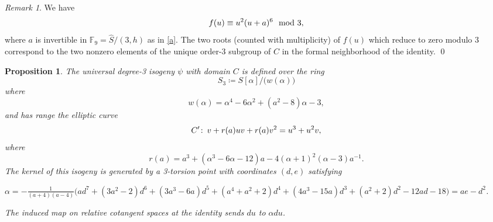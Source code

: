 \documentclass{gtpart}
\newtheorem{prop}[thm]{Proposition}
\theoremstyle{definition}
\theoremstyle{remark}
\newtheorem{rmk}[thm]{Remark}
\def\co{\colon\thinspace}
\newcommand{\mb}[1]{\mathbb{#1}}
\newcommand{\BF}{{\mb F}}
\newcommand{\HS}{\widehat{S}}
\newcommand{\md}{~~{\rm mod}~}
\newcommand{\A}{\alpha}
\begin{document}
\begin{rmk}
\label{rmk:dmod3}
 We have 
 \[
  f(u) \equiv u^2 (u + a)^6 \md 3, 
 \]
 where $a$ is invertible in $\BF_9 = \HS / (3,h)$ as in \eqref{a}.  
 The two roots (counted with multiplicity) of $f(u)$ which reduce to zero modulo 3 correspond to 
 the two nonzero elements of the unique order-3 subgroup of $C$ in the formal neighborhood of the identity.  
\qed
\end{rmk}

\begin{prop}
\label{prop:isog}
 The universal degree-3 isogeny $\psi$ with domain $C$ is defined over the ring 
 \[
  S_3 \coloneqq S[\A] \big/ \big( w(\A) \big) 
 \]
 where 
 \[
  w(\A) = \A^4 - 6 \A^2 + (a^2 - 8) \A - 3, 
 \]
 and has range the elliptic curve 
 \[
  C' \co v + r(a) u v + r(a) v^2 = u^3 + u^2 v, 
 \]
 where 
 \[
  r(a) = a^3 + (\A^3 - 6 \A - 12) a - 4 (\A + 1)^2 (\A - 3) a^{-1}.  
 \]
 The kernel of this isogeny is generated by a 3-torsion point with coordinates $(d,e)$ satisfying 

 $\A = -\frac{1}{(a + 4) (a - 4)} \big(a d^7 + (3 a^2 - 2) d^6 + (3 a^3 - 6 a) d^5 + (a^4 + a^2 + 2) d^4 + (4 a^3 - 15 a) d^3 + (a^2 + 2) d^2 - 12 a d -18\big) = a e - d^2$.  

 The induced map on relative cotangent spaces at the identity sends $du$ to $\A du$.  
\end{prop}
\end{document}
